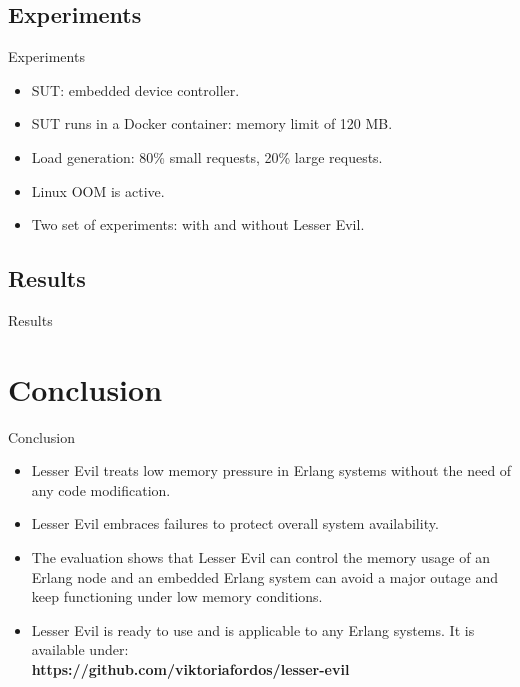 \documentclass{beamer}
\begin{document}
\subsection{Experiments}
\begin{frame}{Experiments}
\begin{itemize}
\item SUT: embedded device controller.
\item SUT runs in a Docker container: memory limit of 120 MB.
\item Load generation: 80\% small requests, 20\% large requests.
\item Linux OOM is active.
\item Two set of experiments: with and without Lesser Evil.
\end{itemize}
\end{frame}

\subsection{Results}
\begin{frame}{Results}

\end{frame}

\section{Conclusion}
\begin{frame}{Conclusion}
\begin{itemize}

\item Lesser Evil treats low memory pressure in Erlang systems without the need of any code modification.
\item Lesser Evil embraces failures to protect overall system availability. 
\item The evaluation shows that Lesser Evil can control the memory usage of an Erlang node and an embedded Erlang system can avoid a major outage and keep functioning under low memory conditions.
\item Lesser Evil is ready to use and is applicable to any Erlang systems. It is available under:\\
\textbf{https://github.com/viktoriafordos/lesser-evil}

\end{itemize}
\end{frame}
\end{document}
